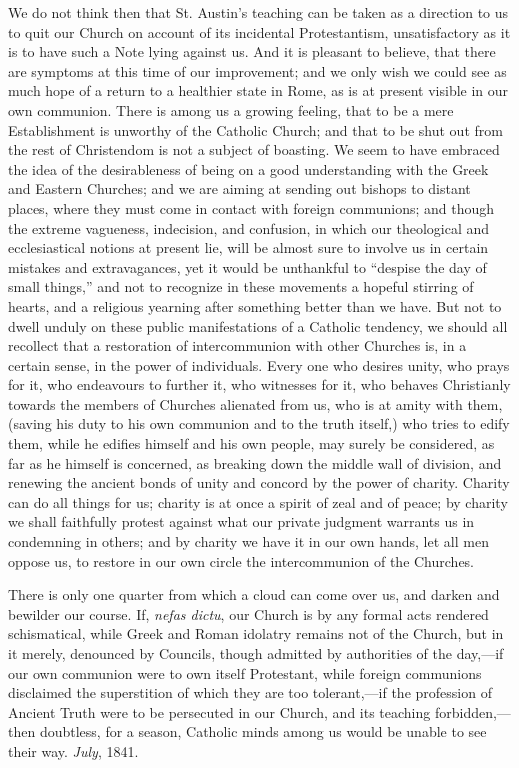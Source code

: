 We do not think then that St. Austin's teaching can be taken as a
direction to us to quit our Church on account of its incidental
Protestantism, unsatisfactory as it is to have such a Note lying
against us. And it is pleasant to believe, that there are symptoms at
this time of our improvement; and we only wish we could see as much
hope of a return to a healthier state in Rome, as is at present
visible in our own communion. There is among us a growing feeling,
that to be a mere Establishment is unworthy of the Catholic Church;
and that to be shut out from the rest of Christendom is not a subject
of boasting. We seem to have embraced the idea of the desirableness of
being on a good understanding with the Greek and Eastern Churches; and
we are aiming at sending out bishops to distant places, where they
must come in contact with foreign communions; and though the extreme
vagueness, indecision, and confusion, in which our theological and
ecclesiastical notions at present lie, will be almost sure to involve
us in certain mistakes and extravagances, yet it would be unthankful
to ``despise the day of small things,'' and not to recognize
in these movements a hopeful stirring of hearts, and a religious yearning after something better than we have. But not to dwell unduly
on these public manifestations of a Catholic tendency, we should all
recollect that a restoration of intercommunion with other Churches is,
in a certain sense, in the power of individuals. Every one who desires
unity, who prays for it, who endeavours to further it, who witnesses
for it, who behaves Christianly towards the members of Churches
alienated from us, who is at amity with them, (saving his duty to his
own communion and to the truth itself,) who tries to edify them, while
he edifies himself and his own people, may surely be considered, as
far as he himself is concerned, as breaking down the middle wall of
division, and renewing the ancient bonds of unity and concord by the
power of charity. Charity can do all things for us; charity is at once
a spirit of zeal and of peace; by charity we shall faithfully protest
against what our private judgment warrants us in condemning in others;
and by charity we have it in our own hands, let all men oppose us, to
restore in our own circle the intercommunion of the Churches.

There is only one quarter from which a cloud can come over us, and
darken and bewilder our course. If, \emph{nefas dictu}, our Church is
by any formal acts rendered schismatical, while Greek and Roman
idolatry remains not of the Church, but in it merely, denounced by
Councils, though admitted by authorities of the day,—if our own
communion were to own itself Protestant, while foreign communions
disclaimed the superstition of which they are too tolerant,—if the
profession of Ancient Truth were to be persecuted in our Church, and
its teaching forbidden,—then doubtless, for a season, Catholic minds
among us would be unable to see their way.
\emph{July}, 1841.

